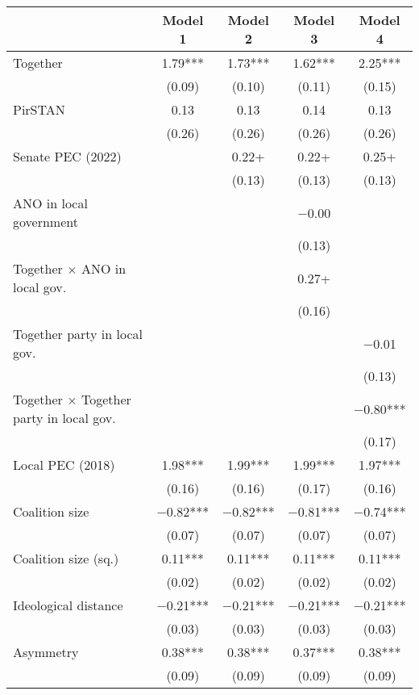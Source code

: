 \begin{table}
\centering
\begin{tabular}[t]{lcccc}
\toprule
  & Model 1 & Model 2 & Model 3 & Model 4\\
\midrule
Together & \num{1.79}*** & \num{1.73}*** & \num{1.62}*** & \num{2.25}***\\
 & (\num{0.09}) & (\num{0.10}) & (\num{0.11}) & (\num{0.15})\\
PirSTAN & \num{0.13} & \num{0.13} & \num{0.14} & \num{0.13}\\
 & (\num{0.26}) & (\num{0.26}) & (\num{0.26}) & (\num{0.26})\\
Senate PEC (2022) &  & \num{0.22}+ & \num{0.22}+ & \num{0.25}+\\
 &  & (\num{0.13}) & (\num{0.13}) & (\num{0.13})\\
ANO in local government &  &  & \num{-0.00} & \\
 &  &  & (\num{0.13}) & \\
Together × ANO in local gov. &  &  & \num{0.27}+ & \\
 &  &  & (\num{0.16}) & \\
Together party in local gov. &  &  &  & \num{-0.01}\\
 &  &  &  & (\num{0.13})\\
Together × Together party in local gov. &  &  &  & \num{-0.80}***\\
 &  &  &  & (\num{0.17})\\
Local PEC (2018) & \num{1.98}*** & \num{1.99}*** & \num{1.99}*** & \num{1.97}***\\
 & (\num{0.16}) & (\num{0.16}) & (\num{0.17}) & (\num{0.16})\\
Coalition size & \num{-0.82}*** & \num{-0.82}*** & \num{-0.81}*** & \num{-0.74}***\\
 & (\num{0.07}) & (\num{0.07}) & (\num{0.07}) & (\num{0.07})\\
Coalition size (sq.) & \num{0.11}*** & \num{0.11}*** & \num{0.11}*** & \num{0.11}***\\
 & (\num{0.02}) & (\num{0.02}) & (\num{0.02}) & (\num{0.02})\\
Ideological distance & \num{-0.21}*** & \num{-0.21}*** & \num{-0.21}*** & \num{-0.21}***\\
 & (\num{0.03}) & (\num{0.03}) & (\num{0.03}) & (\num{0.03})\\
Asymmetry & \num{0.38}*** & \num{0.38}*** & \num{0.37}*** & \num{0.38}***\\
 & (\num{0.09}) & (\num{0.09}) & (\num{0.09}) & (\num{0.09})\\

\end{tabular}
\end{table}
